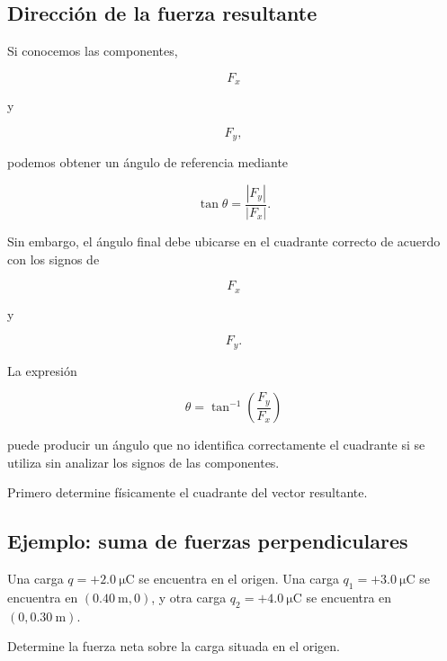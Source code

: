 
\subsection{Dirección de la fuerza resultante}

Si conocemos las componentes,

\[
F_x
\]

y

\[
F_y,
\]

podemos obtener un ángulo de referencia mediante

\[
\tan\theta
=
\frac{|F_y|}{|F_x|}.
\]

Sin embargo, el ángulo final debe ubicarse en el cuadrante correcto de
acuerdo con los signos de

\[
F_x
\]

y

\[
F_y.
\]

\begin{advertencia}

La expresión

\[
\theta
=
\tan^{-1}
\left(
\frac{F_y}{F_x}
\right)
\]

puede producir un ángulo que no identifica correctamente el cuadrante si se
utiliza sin analizar los signos de las componentes.

Primero determine físicamente el cuadrante del vector resultante.

\end{advertencia}



\subsection{Ejemplo: suma de fuerzas perpendiculares}

\begin{ejemplo}

Una carga \(q=+\SI{2.0}{\micro\coulomb}\) se encuentra en el origen.
Una carga \(q_1=+\SI{3.0}{\micro\coulomb}\) se encuentra en
\((\SI{0.40}{\metre},0)\), y otra carga
\(q_2=+\SI{4.0}{\micro\coulomb}\) se encuentra en
\((0,\SI{0.30}{\metre})\).

Determine la fuerza neta sobre la carga situada en el origen.

\end{ejemplo}

